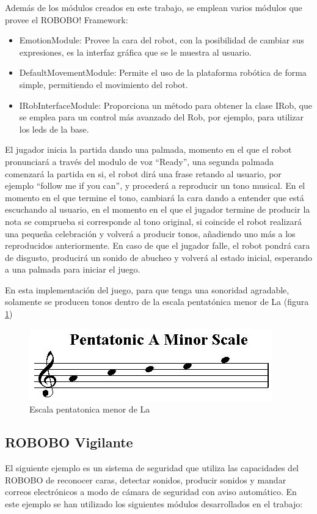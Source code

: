 Además de los módulos creados en este trabajo, se emplean varios módulos que provee el ROBOBO! Framework:

\begin{itemize}
	\item EmotionModule: Provee la cara del robot, con la posibilidad de cambiar sus expresiones, es la interfaz gráfica que se le muestra al usuario.
	\item DefaultMovementModule: Permite el uso de la plataforma robótica de forma simple, permitiendo el movimiento del robot.
	\item IRobInterfaceModule: Proporciona un método para obtener la clase IRob, que se emplea para un control más avanzado del Rob, por ejemplo, para utilizar los leds de la base.
\end{itemize}

El jugador inicia la partida dando una palmada, momento en el que el robot pronunciará a través del modulo de voz \enquote{Ready}, una segunda palmada comenzará la partida en si, el robot dirá una frase retando al usuario, por ejemplo \enquote{follow me if you can}, y procederá a reproducir un tono musical. En el momento en el que termine el tono, cambiará la cara dando a entender que está escuchando al usuario, en el momento en el que el jugador termine de producir la nota se comprueba si corresponde al tono original, si coincide el robot realizará una pequeña celebración y volverá a producir tonos, añadiendo uno más a los reproducidos anteriormente. En caso de que el jugador falle, el robot pondrá cara de disgusto, producirá un sonido de abucheo y volverá al estado inicial, esperando a una palmada para iniciar el juego.

En esta implementación del juego, para que tenga una sonoridad agradable, solamente se producen tonos dentro de la escala pentatónica menor de La (figura \ref{fig:pentatonic-scale})

\begin{figure}
	\centering
	\includegraphics[width=0.6\linewidth]{imagenes/pentatonic-scale-a-minor.jpg}
	\caption{Escala pentatonica menor de La}
	\label{fig:pentatonic-scale}
\end{figure} 


\subsection{ROBOBO Vigilante}
\label{subsec:robobo-vigilante}
El siguiente ejemplo es un sistema de seguridad que utiliza las capacidades del ROBOBO de reconocer caras, detectar sonidos, producir sonidos y mandar correos electrónicos a modo de cámara de seguridad con aviso automático.
En este ejemplo se han utilizado los siguientes módulos desarrollados en el trabajo:

